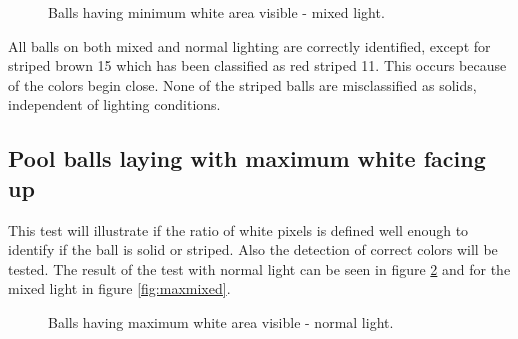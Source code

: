 \begin{figure}[htpb]
  \centering
  \quad
  \quad
   \caption{Balls having minimum white area visible - mixed light.}
  \label{fig:minmixed}
\end{figure}
All balls on both mixed and normal lighting are correctly identified, except for striped brown 15 which has been classified as red striped 11. This occurs because of the colors begin close. None of the striped balls are misclassified as solids, independent of lighting conditions.

\subsection{Pool balls laying with maximum white facing up}
This test will illustrate if the ratio of white pixels is defined well enough to identify if the ball is solid or striped. Also the detection of correct colors will be tested. The result of the test with normal light can be seen in figure \ref{fig:maxnormal} and for the mixed light in figure \ref{fig:maxmixed}.

\begin{figure}[htpb]
  \centering
  \quad
	\quad
   \caption{Balls having maximum white area visible - normal light.}
  \label{fig:maxnormal}
\end{figure}

